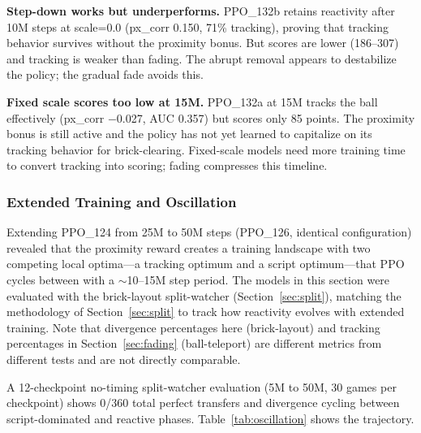 \documentclass[11pt]{article}
\begin{document}
\textbf{Step-down works but underperforms.} PPO\_132b retains reactivity after
10M steps at scale=0.0 (px\_corr 0.150, 71\% tracking), proving that tracking
behavior survives without the proximity bonus. But scores are lower
(186--307) and tracking is weaker than fading. The abrupt removal appears to
destabilize the policy; the gradual fade avoids this.

\textbf{Fixed scale scores too low at 15M.} PPO\_132a at 15M tracks the ball
effectively (px\_corr $-$0.027, AUC 0.357) but scores only 85 points. The
proximity bonus is still active and the policy has not yet learned to
capitalize on its tracking behavior for brick-clearing. Fixed-scale models
need more training time to convert tracking into scoring; fading compresses
this timeline.

\subsubsection{Extended Training and Oscillation}
\label{sec:oscillation}

Extending PPO\_124 from 25M to 50M steps (PPO\_126, identical configuration)
revealed that the proximity reward creates a training landscape with two
competing local optima---a tracking optimum and a script optimum---that PPO
cycles between with a $\sim$10--15M step period. The models in this section
were evaluated with the brick-layout split-watcher (Section~\ref{sec:split}),
matching the methodology of Section~\ref{sec:split} to track how reactivity
evolves with extended training. Note that divergence percentages here
(brick-layout) and tracking percentages in Section~\ref{sec:fading}
(ball-teleport) are different metrics from different tests and are not directly
comparable.

A 12-checkpoint no-timing split-watcher evaluation (5M to 50M, 30 games per
checkpoint) shows 0/360 total perfect transfers and divergence cycling between
script-dominated and reactive phases. Table~\ref{tab:oscillation} shows the
trajectory.
\end{document}
